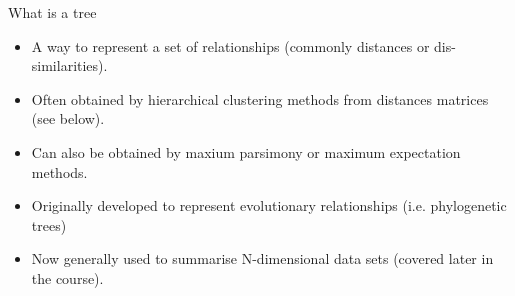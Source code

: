 \documentclass[pdf]{beamer}
\begin{document}
\begin{frame}{What is a tree}
  \begin{itemize}
  \item A way to represent a set of relationships (commonly distances or dis-similarities).
  \item Often obtained by hierarchical clustering methods from distances matrices (see below).
  \item Can also be obtained by maxium parsimony or maximum expectation methods.
  \item Originally developed to represent evolutionary relationships (i.e. phylogenetic trees)
  \item Now generally used to summarise N-dimensional data sets (covered later in the course).
  \end{itemize}
\end{frame}
\end{document}
